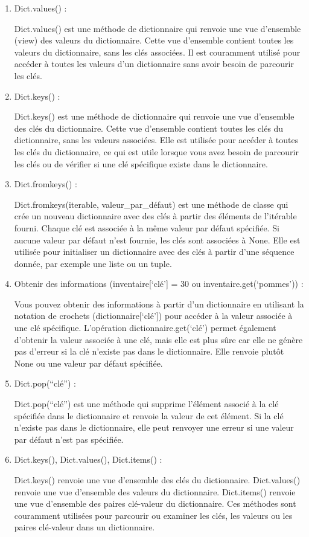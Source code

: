 \documentclass[11pt]{article}
\begin{document}
\begin{enumerate}
\def\labelenumi{\arabic{enumi}.}
\item
  Dict.values() :

  Dict.values() est une méthode de dictionnaire qui renvoie une vue
  d'ensemble (view) des valeurs du dictionnaire. Cette vue d'ensemble
  contient toutes les valeurs du dictionnaire, sans les clés associées.
  Il est couramment utilisé pour accéder à toutes les valeurs d'un
  dictionnaire sans avoir besoin de parcourir les clés.
\item
  Dict.keys() :

  Dict.keys() est une méthode de dictionnaire qui renvoie une vue
  d'ensemble des clés du dictionnaire. Cette vue d'ensemble contient
  toutes les clés du dictionnaire, sans les valeurs associées. Elle est
  utilisée pour accéder à toutes les clés du dictionnaire, ce qui est
  utile lorsque vous avez besoin de parcourir les clés ou de vérifier si
  une clé spécifique existe dans le dictionnaire.
\item
  Dict.fromkeys() :

  Dict.fromkeys(iterable, valeur\_par\_défaut) est une méthode de classe
  qui crée un nouveau dictionnaire avec des clés à partir des éléments
  de l'itérable fourni. Chaque clé est associée à la même valeur par
  défaut spécifiée. Si aucune valeur par défaut n'est fournie, les clés
  sont associées à None. Elle est utilisée pour initialiser un
  dictionnaire avec des clés à partir d'une séquence donnée, par exemple
  une liste ou un tuple.
\item
  Obtenir des informations (inventaire{[}`clé'{]} = 30 ou
  inventaire.get(`pommes')) :

  Vous pouvez obtenir des informations à partir d'un dictionnaire en
  utilisant la notation de crochets (dictionnaire{[}`clé'{]}) pour
  accéder à la valeur associée à une clé spécifique. L'opération
  dictionnaire.get(`clé') permet également d'obtenir la valeur associée
  à une clé, mais elle est plus sûre car elle ne génère pas d'erreur si
  la clé n'existe pas dans le dictionnaire. Elle renvoie plutôt None ou
  une valeur par défaut spécifiée.
\item
  Dict.pop(``clé'') :

  Dict.pop(``clé'') est une méthode qui supprime l'élément associé à la
  clé spécifiée dans le dictionnaire et renvoie la valeur de cet
  élément. Si la clé n'existe pas dans le dictionnaire, elle peut
  renvoyer une erreur si une valeur par défaut n'est pas spécifiée.
\item
  Dict.keys(), Dict.values(), Dict.items() :

  Dict.keys() renvoie une vue d'ensemble des clés du dictionnaire.
  Dict.values() renvoie une vue d'ensemble des valeurs du dictionnaire.
  Dict.items() renvoie une vue d'ensemble des paires clé-valeur du
  dictionnaire. Ces méthodes sont couramment utilisées pour parcourir ou
  examiner les clés, les valeurs ou les paires clé-valeur dans un
  dictionnaire.
\end{enumerate}
\end{document}
